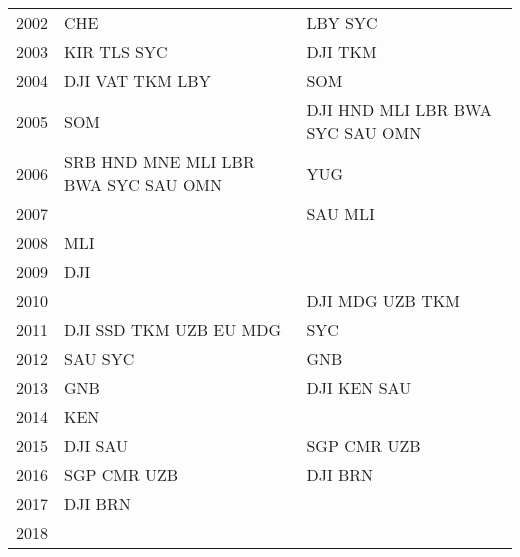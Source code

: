 \begin{table}[ht!]
{\begin{tabular}{rll}
        2002 &                                                CHE &                                            LBY SYC \\
        2003 &                                        KIR TLS SYC &                                            DJI TKM \\
        2004 &                                    DJI VAT TKM LBY &                                                SOM \\
        2005 &                                                SOM &                    DJI HND MLI LBR BWA SYC SAU OMN \\
        2006 &                SRB HND MNE MLI LBR BWA SYC SAU OMN &                                                YUG \\
        2007 &                                                    &                                            SAU MLI \\
        2008 &                                                MLI &                                                    \\
        2009 &                                                DJI &                                                    \\
        2010 &                                                    &                                    DJI MDG UZB TKM \\
        2011 &                             DJI SSD TKM UZB EU MDG &                                                SYC \\
        2012 &                                            SAU SYC &                                                GNB \\
        2013 &                                                GNB &                                        DJI KEN SAU \\
        2014 &                                                KEN &                                                    \\
        2015 &                                            DJI SAU &                                        SGP CMR UZB \\
        2016 &                                        SGP CMR UZB &                                            DJI BRN \\
        2017 &                                            DJI BRN &                                                    \\
        2018 &                                                    &                                                    \\
        \bottomrule
        \end{tabular}
    }
\end{table}